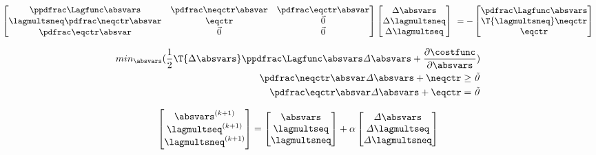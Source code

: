 \documentclass[../main.tex]{subfiles}
\begin{document}
\def\incrabsvars{\Delta \absvars}
\def\incrlagmultsneq{\Delta \lagmultsneq}
\def\incrlagmultseq{\Delta \lagmultseq}
\begin{align}\label{eq:saddlepoint_newtonform}
\begin{bmatrix}
\it{\PPLagfuncBYabsvars}                & \it{\PneqctrBYabsvars} & \it{\PeqctrBYabsvars} \\
\it{\lagmultsneq}\it{\PneqctrBYabsvars} & \it{\eqctr}            & \vec{0}               \\
\it{\PeqctrBYabsvars}                   & \vec{0}                & \vec{0}
\end{bmatrix}
	\begin{bmatrix}
	\incrabsvars \\
	\incrlagmultsneq \\
	\incrlagmultseq
	\end{bmatrix}\
	=
    -\begin{bmatrix}
		\it{\PLagfuncBYabsvars} \\
		\T{\it{\lagmultsneq}} \it{\neqctr} \\
		\it{\eqctr}
		\end{bmatrix}
\end{align}

\begin{align}\label{eq:quadratic_minimization_problem}
min_{\absvars}( \frac{1}{2} \T{\incrabsvars} \it{\PPLagfuncBYabsvars} \incrabsvars + \frac{\partial \it{\costfunc}}{\partial \absvars} ) \\
\it{\PneqctrBYabsvars} \incrabsvars+\it{\neqctr} \geq \vec{0} \\
\it{\PeqctrBYabsvars} \incrabsvars+\it{\eqctr} = \vec{0}
\end{align}

\begin{align}\label{eq:}
\begin{bmatrix}
\absvars^{(k+1)} \\
\lagmultseq^{(k+1)} \\
\lagmultsneq^{(k+1)}
\end{bmatrix} =
  \begin{bmatrix}
  \it{\absvars} \\
  \it{\lagmultseq} \\
  \it{\lagmultsneq} \\
  \end{bmatrix} +
    \it{\alpha}
    \begin{bmatrix}
    \it{\incrabsvars} \\
    \it{\incrlagmultseq} \\
    \it{\incrlagmultsneq} \\
    \end{bmatrix}
\end{align}
\end{document}
